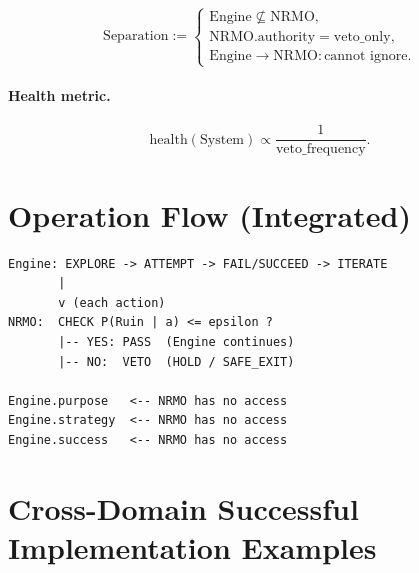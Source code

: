 \begin{equation}
\mathrm{Separation} := \begin{cases}
\mathrm{Engine} \not\subseteq \mathrm{NRMO}, \\
\mathrm{NRMO.authority} = \mathrm{veto\_only}, \\
\mathrm{Engine} \to \mathrm{NRMO}: \text{cannot ignore}.
\end{cases}
\label{eq:separation-definition}
\end{equation}

\paragraph{Health metric.}

\begin{equation}
\mathrm{health}(\mathrm{System}) \propto
\frac{1}{\mathrm{veto\_frequency}}.
\label{eq:health-metric}
\end{equation}

\section{Operation Flow (Integrated)}
\label{sec:strong-engine-flow}

\begin{lstlisting}[basicstyle=\ttfamily\small,frame=single]
Engine: EXPLORE -> ATTEMPT -> FAIL/SUCCEED -> ITERATE
       |
       v (each action)
NRMO:  CHECK P(Ruin | a) <= epsilon ?
       |-- YES: PASS  (Engine continues)
       |-- NO:  VETO  (HOLD / SAFE_EXIT)

Engine.purpose   <-- NRMO has no access
Engine.strategy  <-- NRMO has no access
Engine.success   <-- NRMO has no access
\end{lstlisting}

\section{Cross-Domain Successful Implementation Examples}
\label{sec:strong-engine-examples}

